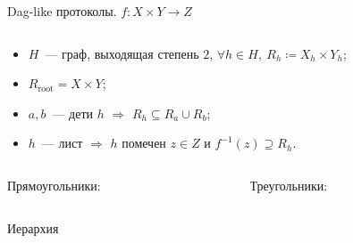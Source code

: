 \begin{frame}{Dag-like протоколы. $f\colon X \times Y \to Z$}
    \vspace{-0.8cm}
    \begin{columns}[t]
        \begin{column}{0.58\textwidth}
            \begin{itemize}
                \item $H$~--- граф, выходящая степень $2$, $\forall h \in H, ~ R_h \coloneqq X_h \times Y_h$;
                \item $R_{\mathrm{root}} = X \times Y$;
                \item $a, b$~--- дети $h$ $\Rightarrow$ $R_{h} \subseteq R_{a} \cup R_{b}$;
                \item $h$~--- лист $\Rightarrow$ $h$ помечен $z \in Z$ и $f^{-1}(z) \supseteq R_h$.
            \end{itemize}
        \end{column}

		\begin{column}{0.38\textwidth}
            \begin{center}
                
            \end{center}
		\end{column}
	\end{columns}

    \pause
    \begin{columns}[t]
		\begin{column}{0.48\textwidth}
            \begin{center}
                Прямоугольники:
                \vspace{0.2cm}
                
            \end{center}
        \end{column}

		\begin{column}{0.48\textwidth}
            \begin{center}
                Треугольники:
                \vspace{0.2cm}
                
            \end{center}
		\end{column}
	\end{columns}
\end{frame}



\begin{frame}{Иерархия}

    
    
\end{frame}
